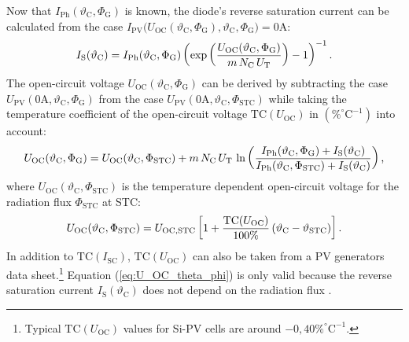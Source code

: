Now that $I_{\mathrm{Ph}}(\vartheta_{\mathrm{C}}, \Phi_{\mathrm{G}})$ is known, the diode's reverse saturation current can be calculated from the case $I_{\mathrm{PV}}\big(U_{\mathrm{OC}}(\vartheta_{\mathrm{C}}, \Phi_{\mathrm{G}}), \vartheta_{\mathrm{C}}, \Phi_{\mathrm{G}}\big) = 0\mathrm{A}$: 
	\begin{equation} \label{eq:I_S_theta_phi}
	\centering
		I_\mathrm{S}(\vartheta_{\mathrm{C}}) = I_{\mathrm{Ph}}( \vartheta_{\mathrm{C}}, \Phi_{\mathrm{G}}) \left( \exp \left( \frac{U_\mathrm{OC}(\vartheta_{\mathrm{C}}, \Phi_{\mathrm{G}})}{m \, N_\mathrm{C} \, U_\mathrm{T}} \right) - 1 \right)^{-1} \text{.}
	\end{equation}
The open-circuit voltage $U_\mathrm{OC}(\vartheta_{\mathrm{C}}, \Phi_{\mathrm{G}})$ can be derived by subtracting the case $U_{\mathrm{PV}}( 0\mathrm{A}, \vartheta_{\mathrm{C}}, \Phi_{\mathrm{G}})$ from the case $U_{\mathrm{PV}}(0\mathrm{A}, \vartheta_{\mathrm{C}}, \Phi_{\mathrm{STC}})$ while taking the temperature coefficient of the open-circuit voltage $\mathrm{TC}(U_{\mathrm{OC}})$ in $\left( \% ^\circ \mathrm{C}^{-1} \right)$ into account:
	\begin{equation} \label{eq:U_OC_theta_phi}
	\centering
		U_\mathrm{OC}(\vartheta_{\mathrm{C}}, \Phi_{\mathrm{G}}) = U_\mathrm{OC}(\vartheta_{\mathrm{C}},\Phi_\mathrm{STC}) + m \, N_\mathrm{C} \, U_\mathrm{T} \, \ln \left( \frac{I_{\mathrm{Ph}}(\vartheta_{\mathrm{C}}, \Phi_{\mathrm{G}}) + I_{\mathrm{S}}(\vartheta_{\mathrm{C}})}{I_\mathrm{Ph}(\vartheta_{\mathrm{C}},\Phi_\mathrm{STC}) + I_{\mathrm{S}}( \vartheta_{\mathrm{C}})} \right) \text{,}
	\end{equation}
where $U_\mathrm{OC}(\vartheta_{\mathrm{C}},\Phi_\mathrm{STC})$ is the temperature dependent open-circuit voltage for the radiation flux $\Phi_\mathrm{STC}$ at STC: 
	\begin{equation} \label{eq:U_OC_phi_STC}
	\centering
		U_\mathrm{OC}(\vartheta_{\mathrm{C}},\Phi_\mathrm{STC}) = U_\mathrm{OC,STC} \left[ 1 + \frac{\mathrm{TC}(U_{\mathrm{OC}})}{100\%} \left(\vartheta_{\mathrm{C}} - \vartheta_{\mathrm{STC}} \right) \right] \text{.}
	\end{equation}
In addition to $\mathrm{TC}(I_{\mathrm{SC}})$, $\mathrm{TC}(U_{\mathrm{OC}})$ can also be taken from a PV generators data sheet.\footnote{Typical $\mathrm{TC}(U_{\mathrm{OC}})$ values for Si-PV cells are around $-0,40 \% ^\circ \mathrm{C}^{-1}$.} Equation (\ref{eq:U_OC_theta_phi}) is only valid because the reverse saturation current $I_\mathrm{S}(\vartheta_{\mathrm{C}})$ does not depend on the radiation flux \cite{Mertens:2015, Tietze:2016, Hering:2017, Wagner:2018}. 

